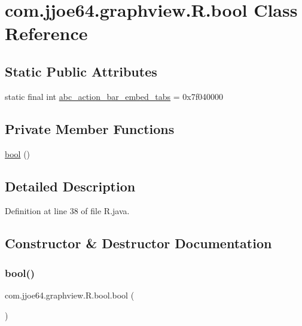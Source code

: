 \hypertarget{classcom_1_1jjoe64_1_1graphview_1_1_r_1_1bool}{}\section{com.\+jjoe64.\+graphview.\+R.\+bool Class Reference}
\label{classcom_1_1jjoe64_1_1graphview_1_1_r_1_1bool}
\subsection*{Static Public Attributes}
\begin{DoxyCompactItemize}
\item 
static final int \mbox{\hyperlink{classcom_1_1jjoe64_1_1graphview_1_1_r_1_1bool_ab29113a31571e3264e195fe02b515053}{abc\+\_\+action\+\_\+bar\+\_\+embed\+\_\+tabs}} = 0x7f040000
\end{DoxyCompactItemize}
\subsection*{Private Member Functions}
\begin{DoxyCompactItemize}
\item 
\mbox{\hyperlink{classcom_1_1jjoe64_1_1graphview_1_1_r_1_1bool_a71cd2ca916e69016bef049c9e46fd373}{bool}} ()
\end{DoxyCompactItemize}


\subsection{Detailed Description}


Definition at line 38 of file R.\+java.



\subsection{Constructor \& Destructor Documentation}
\mbox{\label{classcom_1_1jjoe64_1_1graphview_1_1_r_1_1bool_a71cd2ca916e69016bef049c9e46fd373}} 
\subsubsection{\texorpdfstring{bool()}{bool()}}
{\footnotesize\ttfamily com.\+jjoe64.\+graphview.\+R.\+bool.\+bool (\begin{DoxyParamCaption}{ }\end{DoxyParamCaption})\hspace{0.3cm}{\ttfamily [private]}}



